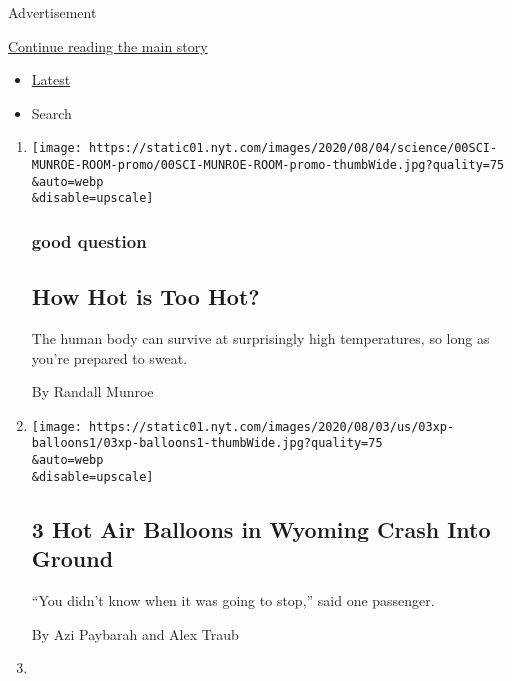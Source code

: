 Advertisement

\protect\hyperlink{after-mid1}{Continue reading the main story}

\begin{itemize}
\tightlist
\item
  \protect\hyperlink{stream-panel}{Latest}
\item
  Search
\end{itemize}

\begin{enumerate}
\def\labelenumi{\arabic{enumi}.}
\item
  \href{/2020/08/04/science/randall-munroe-xkcd-temperature.html}{}

  \texttt{[image: https://static01.nyt.com/images/2020/08/04/science/00SCI-MUNROE-ROOM-promo/00SCI-MUNROE-ROOM-promo-thumbWide.jpg?quality=75\\\&auto=webp\\\&disable=upscale]}

  \hypertarget{good-question}{%
  \subsubsection{good question}\label{good-question}}

  \hypertarget{how-hot-is-too-hot}{%
  \subsection{How Hot is Too Hot?}\label{how-hot-is-too-hot}}

  The human body can survive at surprisingly high temperatures, so long
  as you're prepared to sweat.

  By Randall Munroe
\item
  \href{/2020/08/04/us/wyoming-hot-air-balloons-crash.html}{}

  \texttt{[image: https://static01.nyt.com/images/2020/08/03/us/03xp-balloons1/03xp-balloons1-thumbWide.jpg?quality=75\\\&auto=webp\\\&disable=upscale]}

  \hypertarget{3-hot-air-balloons-in-wyoming-crash-into-ground}{%
  \subsection{3 Hot Air Balloons in Wyoming Crash Into
  Ground}\label{3-hot-air-balloons-in-wyoming-crash-into-ground}}

  ``You didn't know when it was going to stop,'' said one passenger.

  By Azi Paybarah and Alex Traub
\item
  \href{/2020/08/03/us/racism-massachusetts-grandfathering.html}{}


\end{enumerate}
